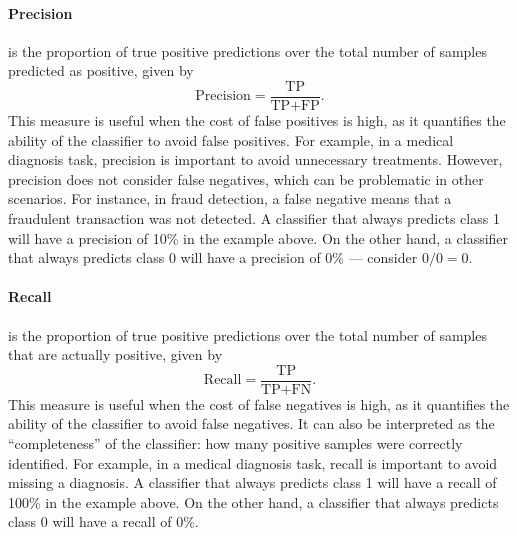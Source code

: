 \paragraph{Precision} is the proportion of true positive predictions over the total number
of samples predicted as positive, given by
\begin{equation*}
  \text{Precision} = \frac{\text{TP}}{\text{TP} + \text{FP}}\text{.}
\end{equation*}
This measure is useful when the cost of false positives is high, as it quantifies the
ability of the classifier to avoid false positives.  For example, in a medical diagnosis
task, precision is important to avoid unnecessary treatments.  However, precision does not
consider false negatives, which can be problematic in other scenarios.  For instance, in
fraud detection, a false negative means that a fraudulent transaction was not detected.
A classifier that always predicts class 1 will have a precision of 10\% in the example
above.  On the other hand, a classifier that always predicts class 0 will have a precision
of 0\% --- consider $0/0 = 0$.

\paragraph{Recall} is the proportion of true positive predictions over the total number of
samples that are actually positive, given by
\begin{equation*}
  \text{Recall} = \frac{\text{TP}}{\text{TP} + \text{FN}}\text{.}
\end{equation*}
This measure is useful when the cost of false negatives is high, as it quantifies the
ability of the classifier to avoid false negatives.  It can also be interpreted as the
``completeness'' of the classifier: how many positive samples were correctly identified.
For example, in a medical diagnosis task, recall is important to avoid missing a
diagnosis.  A classifier that always predicts class 1 will have a recall of 100\% in the
example above.  On the other hand, a classifier that always predicts class 0 will have a
recall of 0\%.

